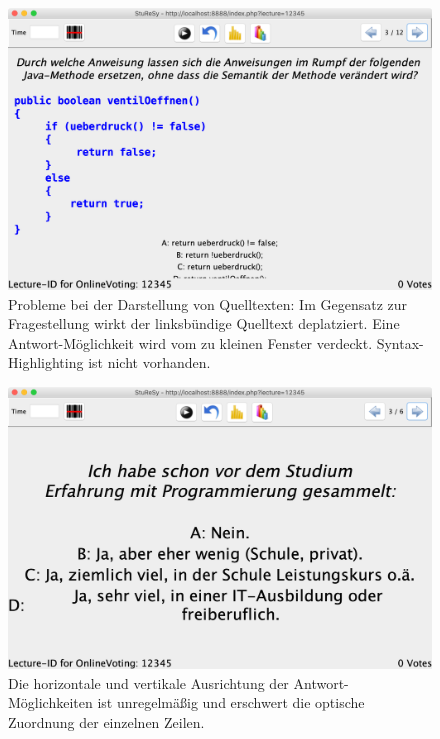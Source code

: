 \begin{figure}[H]
    \includegraphics[width=12cm]{chapter/bewertung/bilder/StuReSy_Problem_2.png}
    \centering
    \caption{Probleme bei der Darstellung von Quelltexten: Im Gegensatz zur Fragestellung wirkt der linksbündige Quelltext deplatziert. Eine Antwort-Möglichkeit wird vom zu kleinen Fenster verdeckt. Syntax-Highlighting ist nicht vorhanden.}
    \label{Abbildung 2.2}
\end{figure}

\begin{figure}[H]
    \includegraphics[width=12cm]{chapter/bewertung/bilder/StuReSy_Problem_1.png}
    \centering
    \caption{Die horizontale und vertikale Ausrichtung der Antwort-Möglichkeiten ist unregelmäßig und erschwert die optische Zuordnung der einzelnen Zeilen.}
    \label{Abbildung 2.3}
\end{figure}
